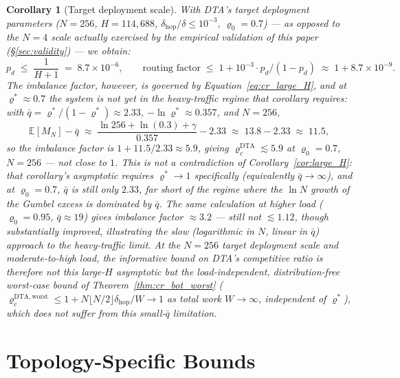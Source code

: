 \documentclass[11pt,a4paper]{report}
\newtheorem{corollary}[theorem]{Corollary}
\begin{document}
\begin{corollary}[Target deployment scale]\label{cor:benchmark}
With DTA's \emph{target deployment} parameters ($N = 256$, $H = 114{,}688$,
$\delta_{\mathrm{hop}}/\delta \le 10^{-3}$, $\varrho_0 = 0.7$) --- as
opposed to the $N=4$ scale actually exercised by the empirical
validation of this paper (\S\ref{sec:validity}) --- we obtain:
\[
  p_d \;\le\; \frac{1}{H+1} \;=\; 8.7 \times 10^{-6},
  \qquad
  \text{routing factor} \;\le\; 1 + 10^{-3} \cdot p_d / (1-p_d)
  \;\approx\; 1 + 8.7\times 10^{-9}.
\]
The \emph{imbalance} factor, however, is governed by
Equation~\eqref{eq:cr_large_H}, and at $\varrho^* \approx 0.7$ the system
is not yet in the heavy-traffic regime that corollary requires: with
$\bar q = \varrho^*/(1-\varrho^*) \approx 2.33$,
$-\ln\varrho^* \approx 0.357$, and $N=256$,
\[
  \mathbb{E}[M_N] - \bar q
  \;\approx\;
  \frac{\ln 256 + \ln(0.3) + \gamma}{0.357} - 2.33
  \;\approx\; 13.8 - 2.33 \;\approx\; 11.5,
\]
so the imbalance factor is $1 + 11.5/2.33 \approx 5.9$, giving
$\varrho_c^{\mathrm{DTA}} \lesssim 5.9$ at $\varrho_0 = 0.7$, $N=256$ ---
\emph{not} close to $1$. This is not a contradiction of
Corollary~\ref{cor:large_H}: that corollary's asymptotic requires
$\varrho^* \to 1$ specifically (equivalently $\bar q \to \infty$), and at
$\varrho_0 = 0.7$, $\bar q$ is still only $2.33$, far short of the
regime where the $\ln N$ growth of the Gumbel excess is dominated by
$\bar q$. The same calculation at higher load ($\varrho_0=0.95$,
$\bar q \approx 19$) gives imbalance factor $\approx 3.2$ --- still not
$\lesssim 1.12$, though substantially improved, illustrating the slow
(logarithmic in $N$, linear in $\bar q$) approach to the heavy-traffic
limit. At
the $N=256$ target deployment scale and moderate-to-high load, the
informative bound on DTA's competitive ratio is therefore not this
large-$H$ asymptotic but the load-independent, distribution-free
worst-case bound of Theorem~\ref{thm:cr_bot_worst}
($\varrho_c^{\mathrm{DTA,worst}} \leq 1 + N\lfloor N/2\rfloor
\delta_{\mathrm{hop}}/W \to 1$ as total work $W \to \infty$, independent
of $\varrho^*$), which does not suffer from this small-$\bar q$
limitation.
\end{corollary}

\section{Topology-Specific Bounds}
\end{document}
